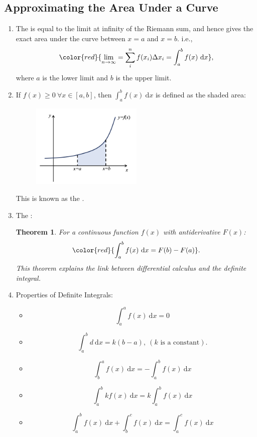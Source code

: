 \documentclass[12pt, a4paper]{article}
\newtheorem{theorem}{Theorem}[subsection]
\def\d{{\mathrm{d}}}
\begin{document}
\subsection{Approximating the Area Under a Curve}
\begin{enumerate}
    \item The {\color{red}{definite integral}} is equal to the limit at infinity of the Riemann sum, and hence gives the exact area under the curve between $x=a$ and $x=b$. i.e., 
    $${\color{red}{\lim_{n\to\infty}=\sum_{i}^{n}f(x_i)\Delta x_i=\int_a^b f(x)\ \mathrm{d}x}}, $$
    where $a$ is the lower limit and $b$ is the upper limit. 
    \item If $f(x)\geq 0\ \forall x\in\left[a,b\right]$, then $\int_a^bf(x)\ \mathrm{d}x$ is defined as the shaded area: 
    \begin{figure}[H]
        \centering 
        \includegraphics[width=0.5\textwidth]{Fig.5.6.jpg} 
    \end{figure}
    This is known as the {\color{red}{Riemann integral}}.
    \item The {\color{red}{Fundamental Theorem of Calculus}}: 
    \begin{theorem}
        For a continuous function $f(x)$ with antiderivative $F(x)$: 
        $${\color{red}{\int_a^bf(x)\ \d x=F(b)-F(a)}}.$$
        This theorem explains the link between differential calculus and the definite integral. 
    \end{theorem}
    \item Properties of Definite Integrals: 
    \begin{itemize}
        \item $$\int_a^af(x)\ \d x=0$$
        \item $$\int_a^bd\ \d x=k(b-a),\ (k\text{ is a constant}).$$
        \item $$\int_b^af(x)\ \d x=-\int_a^bf(x)\ \d x$$
        \item $$\int_a^bkf(x)\ \d x=k\int_a^bf(x)\ \d x$$
        \item $$\int_a^bf(x)\ \d x+\int_b^cf(x)\ \d x=\int_a^cf(x)\ \d x$$

\end{itemize}
\end{enumerate}
\end{document}
